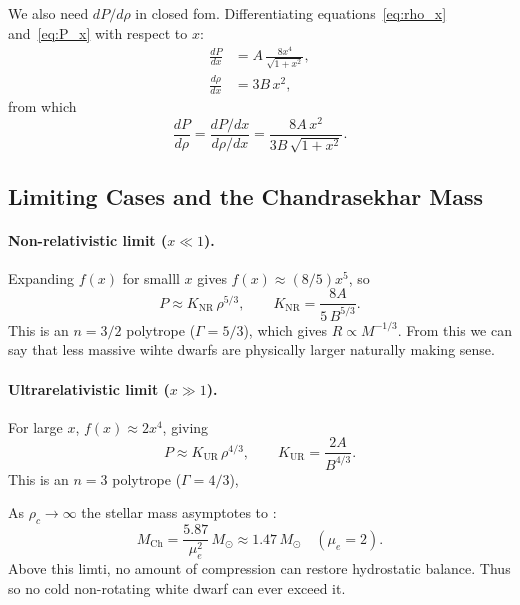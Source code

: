 \documentclass[12pt,letterpaper]{article}
\begin{document}
We also need $dP/d\rho$ in closed fom.
Differentiating equations~\eqref{eq:rho_x} and~\eqref{eq:P_x} with respect to $x$:
\begin{align}
  \frac{dP}{dx}   &= A\,\frac{8x^4}{\sqrt{1+x^2}},
  \label{eq:dPdx}\\
  \frac{d\rho}{dx} &= 3B\,x^2,
  \label{eq:drhodx}
\end{align}
from which
\begin{equation}
  \frac{dP}{d\rho} = \frac{dP/dx}{d\rho/dx}
    = \frac{8A\,x^2}{3B\,\sqrt{1+x^2}}.
  \label{eq:dPdrho}
\end{equation}


\subsection{Limiting Cases and the Chandrasekhar Mass}

\paragraph{Non-relativistic limit ($x \ll 1$).}
Expanding $f(x)$ for smalll $x$ gives $f(x) \approx (8/5)x^5$, so
\begin{equation}
  P \approx K_\mathrm{NR}\,\rho^{5/3},
  \qquad
  K_\mathrm{NR} = \frac{8A}{5\,B^{5/3}}.
  \label{eq:PNR}
\end{equation}
This is an $n = 3/2$ polytrope ($\Gamma = 5/3$), which gives $R \propto M^{-1/3}$. From this
we can say that less massive wihte dwarfs are physically larger naturally making sense.

\paragraph{Ultrarelativistic limit ($x \gg 1$).}
For large $x$, $f(x) \approx 2x^4$, giving
\begin{equation}
  P \approx K_\mathrm{UR}\,\rho^{4/3},
  \qquad
  K_\mathrm{UR} = \frac{2A}{B^{4/3}}.
  \label{eq:PUR}
\end{equation}
This is an $n = 3$ polytrope ($\Gamma = 4/3$),

As $\rho_c \to \infty$ the stellar mass asymptotes to \citep{chandrasekhar1931,shapiro1983}:
\begin{equation}
  M_\mathrm{Ch} = \frac{5.87}{\mu_e^2}\,M_\odot
  \approx 1.47\,M_\odot \quad (\mu_e = 2).
  \label{eq:Mch}
\end{equation}
Above this limti, no amount of compression can restore hydrostatic balance. Thus so no
cold non-rotating white dwarf can ever exceed it.
\end{document}

